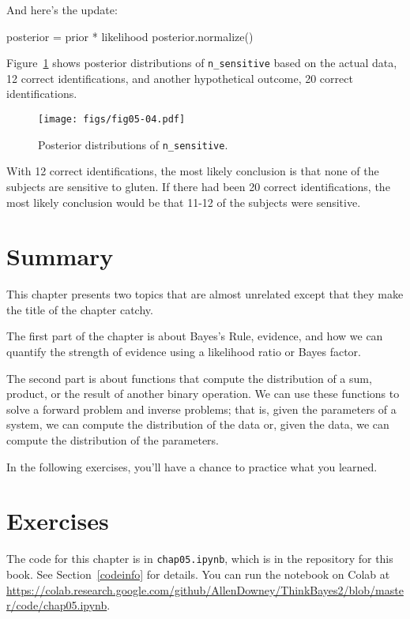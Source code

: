 \documentclass[12pt]{book}
\theoremstyle{exercise}
\newcommand{\py}[1]{{\tt #1}}%
\begin{document}
And here's the update:

\begin{code}
posterior = prior * likelihood
posterior.normalize()
\end{code}

Figure~\ref{fig05-04} shows posterior distributions of \py{n_sensitive} based on the actual data, 12 correct identifications, and another hypothetical outcome, 20 correct identifications.

\begin{figure}
\centerline{\texttt{[image: figs/fig05-04.pdf]}}
\caption{Posterior distributions of \py{n_sensitive}.}
\label{fig05-04}
\end{figure}

With 12 correct identifications, the most likely conclusion is that none of the subjects are sensitive to gluten.
If there had been 20 correct identifications, the most likely conclusion would be that 11-12 of the subjects were sensitive.


\section{Summary}

This chapter presents two topics that are almost unrelated except that they make the title of the chapter catchy.

The first part of the chapter is about Bayes's Rule, evidence, and how we can quantify the strength of evidence using a likelihood ratio or Bayes factor.

The second part is about functions that compute the distribution of a sum, product, or the result of another binary operation.
We can use these functions to solve a forward problem and inverse problems; that is, given the parameters of a system, we can compute the distribution of the data or, given the data, we can compute the distribution of the parameters.

In the following exercises, you'll have a chance to practice what you learned.


\section{Exercises}

The code for this chapter is in \py{chap05.ipynb}, which is in the repository for this book.  See Section~\ref{codeinfo} for details.
You can run the notebook on Colab at \url{https://colab.research.google.com/github/AllenDowney/ThinkBayes2/blob/master/code/chap05.ipynb}.
\end{document}
